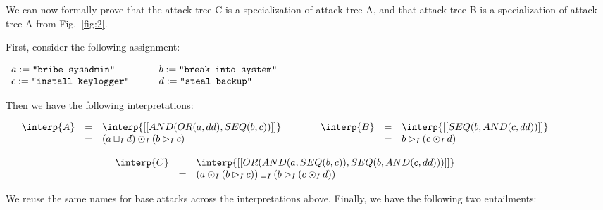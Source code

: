 We can now formally prove that the attack tree C is a specialization
of attack tree A, and that attack tree B is a specialization of attack
tree A from Fig.~\ref{fig:2}.
\begin{example}
  \label{ex:ex1}
  First, consider the following assignment:
\begin{center}
  \begin{math}
    \begin{array}{lllllll}
      a := \verb!"bribe sysadmin"!
      & \quad &
      b := \verb!"break into system"!
      \\
      c := \verb!"install keylogger"!
      & \quad &
      d := \verb!"steal backup"!
    \end{array}
  \end{math}
\end{center}
Then we have the following interpretations:
\begin{center}
  \footnotesize
  \begin{math}
    \begin{array}{c}
      \begin{array}{ccc}
        \begin{array}{rclcl}
        \interp{A} & = & \interp{[[AND(OR(a,dd),SEQ(b,c))]]} \\
                   & = & (a \sqcup_I d) \odot_I (b \rhd_I c)\\
      \end{array}
      & \quad &
      \begin{array}{rclcl}
        \interp{B} & = & \interp{[[SEQ(b,AND(c,dd))]]} \\
                   & = & b \rhd_I (c \odot_I d)\\      
      \end{array}
      \end{array}
      \\ \\
      \begin{array}{rclcl}
        \interp{C} & = & \interp{[[OR(AND(a,SEQ(b,c)),SEQ(b,AND(c,dd)))]]}\\
                   & = & (a \odot_I (b \rhd_I c)) \sqcup_I (b \rhd_I (c \odot_I d))\\
      \end{array}
    \end{array}        
  \end{math}
\end{center}
We reuse the same names for base attacks across the interpretations
above.  Finally, we have the following two entailments:

\end{example}
